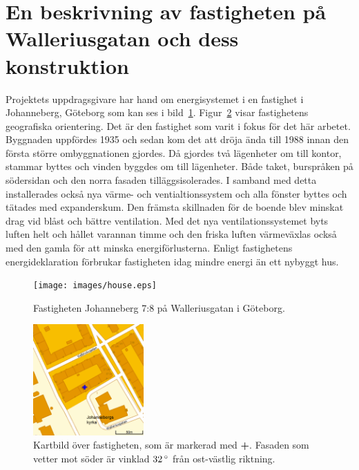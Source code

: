 \section{En beskrivning av fastigheten på Walleriusgatan och dess konstruktion}
\label{subsec:thehouse}




Projektets uppdragsgivare har hand om energisystemet i en fastighet i Johanneberg,
Göteborg som kan ses i bild~\ref{fig:thehouse:house}. Figur~\ref{fig:thehouse:map}
visar fastighetens geografiska orientering.
Det är den fastighet som varit i fokus för det här arbetet. Byggnaden uppfördes 1935\cite{ritningar_urspr}
och sedan kom det att dröja ända till 1988 innan den första större ombyggnationen gjordes.
Då gjordes två lägenheter om till kontor, stammar byttes och vinden byggdes om till lägenheter.
Både taket, burspråken på södersidan och den norra fasaden tilläggsisolerades.
I samband med detta installerades också nya värme- och ventialtionssystem och alla
fönster byttes och tätades med expanderskum. Den främsta skillnaden för de boende
blev minskat drag vid blåst och bättre ventilation.  Med det nya ventilationssystemet
byts luften helt och hållet varannan timme och den friska luften värmeväxlas också med den gamla för att minska energiförlusterna. Enligt fastighetens energideklaration\cite{energideklaration}
förbrukar fastigheten idag mindre energi än ett nybyggt hus.

\begin{figure}
\centering
\texttt{[image: images/house.eps]}
\caption{Fastigheten Johanneberg 7:8 på Walleriusgatan i Göteborg.}
\label{fig:thehouse:house}
\end{figure}

\begin{figure}
\centering
\includegraphics[width=1.67in,height=1.67in]{images/map.eps}
\caption{Kartbild över fastigheten, som är markerad med \textbf{\color{blue}+}. Fasaden som vetter mot söder är vinklad $\unit[32]{^\circ}$ från
ost-västlig riktning.}
\label{fig:thehouse:map}
\end{figure}

